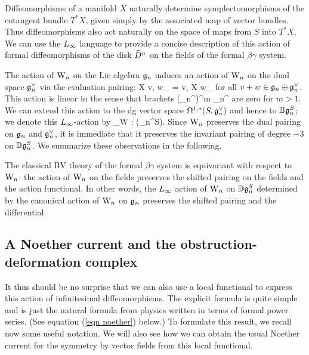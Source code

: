 Diffeomorphisms of a manifold $X$ naturally determine symplectomorphisms of the cotangent bundle $T^*X$,
given simply by the associated map of vector bundles.
Thus diffeomorphisms also act naturally on the space of maps from $S$ into $T^*X$.
We can use the $\L8$ language to provide a concise description of 
this action of formal diffeomorphisms of the disk $\widehat{D}^n$ on the fields of the formal $\beta\gamma$ system.

The action of ${{\rm W}_n}$ on the Lie algebra $\mathfrak{g}_n$ induces an action of ${{\rm W}_n}$ on the dual space $\mathfrak g_n^\vee$ via the evaluation pairing:
\ben
\<X \cdot v, w\>_{\fgn} = \<v, X \cdot w\>_{\fgn}
\een
for all $v + w \in \mathfrak{g}_n \oplus \mathfrak{g}_n^\vee$. 
This action is linear in the sense that brackets
\ben
\Vect \otimes (\fg_n^\vee)^{\otimes m} \to \fg_n^\vee
\een
are zero for $m > 1$. 
We can extend this action to the dg vector space $\Omega^{1,*}(S, \mathfrak g_n^\vee)$ and hence to $\mathbb D \mathfrak g_n^S$;
we denote this $\L8$-action by
\ben
\DD \rho_W : \Vect \to \Der(\DD \fg_n^S).
\een
Since ${{\rm W}_n}$ preserves the dual pairing on $\mathfrak g_n$ and $\mathfrak g_n^\vee$, 
it is immediate that it preserves the invariant pairing of degree $-3$ on $\mathbb D \mathfrak g_n^S$. 
We summarize these observations in the following.

\begin{lemma}
The classical BV theory of the formal $\beta\gamma$ system is equivariant with respect to ${{\rm W}_n}$:
the action of ${{\rm W}_n}$ on the fields preserves the shifted pairing on the fields and the action functional.
In other words, the $\L8$ action of ${{\rm W}_n}$ on $\mathbb D\mathfrak{g}_n^S$ determined by the canonical action of ${{\rm W}_n}$ on $\mathfrak{g}_n$ preserves the shifted pairing and the differential.
\end{lemma}

\subsection{A Noether current and the obstruction-deformation complex}
\label{sec obsdef}

It thus should be no surprise that we can also use a local functional to express this action of infinitesimal diffeomorphisms. The explicit formula is quite simple and is just the natural formula from physics written in terms of formal power series. (See equation (\ref{eqn noether}) below.) To formulate this result, we recall now some useful notation. We will also see how we can obtain the usual Noether current for the symmetry by vector fields from this local functional.  

